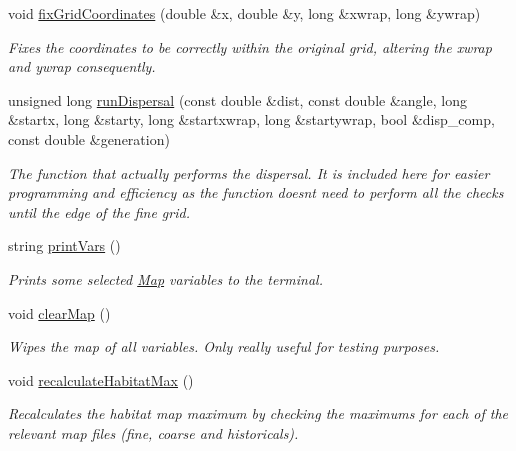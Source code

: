 \begin{DoxyCompactItemize}
void \hyperlink{class_landscape_a5aa0fca1b87ab838ebab933ef6daf4a2}{fix\+Grid\+Coordinates} (double \&x, double \&y, long \&xwrap, long \&ywrap)
\begin{DoxyCompactList}\small\item\em Fixes the coordinates to be correctly within the original grid, altering the xwrap and ywrap consequently. \end{DoxyCompactList}\item 
unsigned long \hyperlink{class_landscape_aedc33de89997456d53cceb3e4e424e64}{run\+Dispersal} (const double \&dist, const double \&angle, long \&startx, long \&starty, long \&startxwrap, long \&startywrap, bool \&disp\+\_\+comp, const double \&generation)
\begin{DoxyCompactList}\small\item\em The function that actually performs the dispersal. It is included here for easier programming and efficiency as the function doesn\textquotesingle{}t need to perform all the checks until the edge of the fine grid. \end{DoxyCompactList}\item 
string \hyperlink{class_landscape_a9b867a59c88f754bae6788451845b698}{print\+Vars} ()
\begin{DoxyCompactList}\small\item\em Prints some selected \hyperlink{class_map}{Map} variables to the terminal. \end{DoxyCompactList}\item 
void \hyperlink{class_landscape_a28d01a593cbaf9d8fde9c2e1da996f91}{clear\+Map} ()\hypertarget{class_landscape_a28d01a593cbaf9d8fde9c2e1da996f91}{}\label{class_landscape_a28d01a593cbaf9d8fde9c2e1da996f91}

\begin{DoxyCompactList}\small\item\em Wipes the map of all variables. Only really useful for testing purposes. \end{DoxyCompactList}\item 
void \hyperlink{class_landscape_abaf14ac4da88cd26f6593bdaa88d999f}{recalculate\+Habitat\+Max} ()\hypertarget{class_landscape_abaf14ac4da88cd26f6593bdaa88d999f}{}\label{class_landscape_abaf14ac4da88cd26f6593bdaa88d999f}

\begin{DoxyCompactList}\small\item\em Recalculates the habitat map maximum by checking the maximums for each of the relevant map files (fine, coarse and historicals). \end{DoxyCompactList}\end{DoxyCompactItemize}
